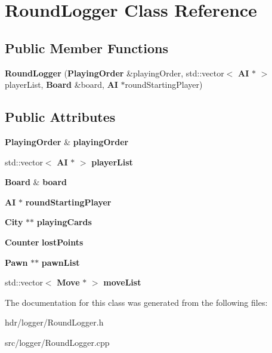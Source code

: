 \section{Round\-Logger Class Reference}
\label{class_round_logger}
\subsection*{Public Member Functions}
\begin{DoxyCompactItemize}
\item 
{\bfseries Round\-Logger} ({\bf Playing\-Order} \&playing\-Order, std\-::vector$<$ {\bf A\-I} $\ast$ $>$ player\-List, {\bf Board} \&board, {\bf A\-I} $\ast$round\-Starting\-Player)\label{class_round_logger_a319ff2d7dee4b15c102138bda1b027fc}

\end{DoxyCompactItemize}
\subsection*{Public Attributes}
\begin{DoxyCompactItemize}
\item 
{\bf Playing\-Order} \& {\bfseries playing\-Order}\label{class_round_logger_a7fd0f9fd826753aa3715ba85e863ab3f}

\item 
std\-::vector$<$ {\bf A\-I} $\ast$ $>$ {\bfseries player\-List}\label{class_round_logger_aebd799e774b85f36a77e1fa4cfe5687b}

\item 
{\bf Board} \& {\bfseries board}\label{class_round_logger_a256a2d63cc85c71f8a57268b1829e6df}

\item 
{\bf A\-I} $\ast$ {\bfseries round\-Starting\-Player}\label{class_round_logger_adfb669d859b3e9e1bd18a8ae1a31cf6b}

\item 
{\bf City} $\ast$$\ast$ {\bfseries playing\-Cards}\label{class_round_logger_a4e30b0c6cf75d64dd8c3af86e240e188}

\item 
{\bf Counter} {\bfseries lost\-Points}\label{class_round_logger_a48257ec06504aa78fc89fe943d06aca8}

\item 
{\bf Pawn} $\ast$$\ast$ {\bfseries pawn\-List}\label{class_round_logger_a3ba92d778f19c90572cfa6d7df0dcd5f}

\item 
std\-::vector$<$ {\bf Move} $\ast$ $>$ {\bfseries move\-List}\label{class_round_logger_a0c998b04cc3185ea20d2a7444cda1323}

\end{DoxyCompactItemize}


The documentation for this class was generated from the following files\-:\begin{DoxyCompactItemize}
\item 
hdr/logger/Round\-Logger.\-h\item 
src/logger/Round\-Logger.\-cpp\end{DoxyCompactItemize}
